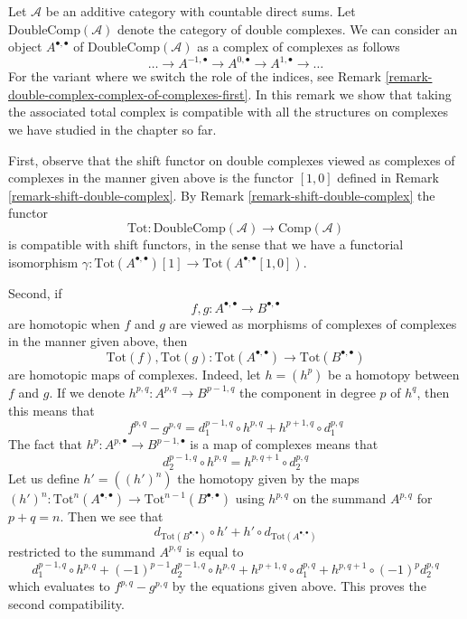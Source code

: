 \begin{remark}
\label{remark-double-complex-complex-of-complexes-second}
Let $\mathcal{A}$ be an additive category with countable direct sums.
Let $\text{DoubleComp}(\mathcal{A})$ denote the category of double complexes.
We can consider an object $A^{\bullet, \bullet}$ of
$\text{DoubleComp}(\mathcal{A})$ as a complex of complexes
as follows
$$
\ldots \to A^{-1, \bullet} \to A^{0, \bullet} \to A^{1, \bullet} \to \ldots
$$
For the variant where we switch the role of the indices, see
Remark \ref{remark-double-complex-complex-of-complexes-first}.
In this remark we show that taking the associated total complex
is compatible with all the structures on complexes we have studied
in the chapter so far.

\medskip\noindent
First, observe that the shift functor on double complexes viewed
as complexes of complexes in the manner given above is the functor
$[1, 0]$ defined in Remark \ref{remark-shift-double-complex}.
By Remark \ref{remark-shift-double-complex} the functor
$$
\text{Tot} : \text{DoubleComp}(\mathcal{A}) \to \text{Comp}(\mathcal{A})
$$
is compatible with shift functors, in the sense that we have a functorial
isomorphism $\gamma : \text{Tot}(A^{\bullet, \bullet})[1] \to
\text{Tot}(A^{\bullet, \bullet}[1, 0])$.

\medskip\noindent
Second, if
$$
f, g : A^{\bullet, \bullet} \to B^{\bullet, \bullet}
$$
are homotopic when $f$ and $g$ are viewed as morphisms of complexes
of complexes in the manner given above, then
$$
\text{Tot}(f), \text{Tot}(g) :
\text{Tot}(A^{\bullet, \bullet}) \to \text{Tot}(B^{\bullet, \bullet})
$$
are homotopic maps of complexes. Indeed, let $h = (h^p)$
be a homotopy between $f$ and $g$. If we denote
$h^{p, q} : A^{p, q} \to B^{p - 1, q}$ the component in degree $p$ of $h^q$,
then this means that
$$
f^{p, q} - g^{p, q} = d_1^{p - 1, q} \circ h^{p, q} +
h^{p + 1, q} \circ d_1^{p, q}
$$
The fact that $h^p : A^{p, \bullet} \to B^{p - 1, \bullet}$ is a map of
complexes means that
$$
d_2^{p - 1, q} \circ h^{p, q} = h^{p, q + 1} \circ d_2^{p, q}
$$
Let us define $h' = ((h')^n)$ the homotopy given by the maps
$(h')^n : \text{Tot}^n(A^{\bullet, \bullet}) \to
\text{Tot}^{n - 1}(B^{\bullet, \bullet})$
using $h^{p, q}$ on the summand $A^{p, q}$ for $p + q = n$.
Then we see that
$$
d_{\text{Tot}(B^{\bullet, \bullet})} \circ h' +
h' \circ d_{\text{Tot}(A^{\bullet, \bullet})}
$$
restricted to the summand $A^{p, q}$ is equal to
$$
d_1^{p - 1, q} \circ h^{p, q} +
(-1)^{p - 1} d_2^{p - 1, q} \circ h^{p, q} +
h^{p + 1, q} \circ d_1^{p, q} +
h^{p, q + 1} \circ (-1)^p d_2^{p, q}
$$
which evaluates to $f^{p, q} - g^{p, q}$ by the equations given above.
This proves the second compatibility.


\end{remark}
